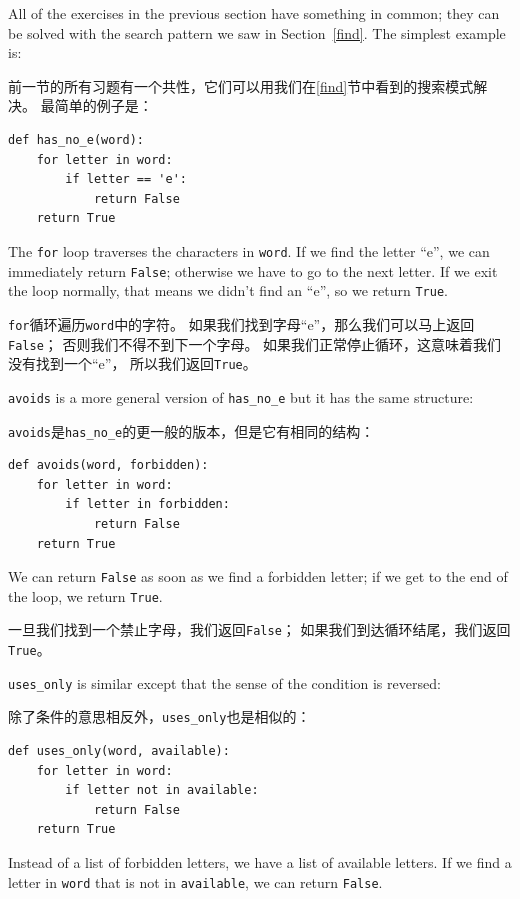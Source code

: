 \documentclass[10pt]{book}
\begin{document}
\begin{CJK}{UTF8}{gbsn}
All of the exercises in the previous section have something
in common; they can be solved with the search pattern we saw
in Section~\ref{find}.  The simplest example is:

前一节的所有习题有一个共性，它们可以用我们在\ref{find}节中看到的搜索模式解决。
最简单的例子是：

\begin{verbatim}
def has_no_e(word):
    for letter in word:
        if letter == 'e':
            return False
    return True
\end{verbatim}
%
The {\tt for} loop traverses the characters in {\tt word}.  If we find
the letter ``e'', we can immediately return {\tt False}; otherwise we
have to go to the next letter.  If we exit the loop normally, that
means we didn't find an ``e'', so we return {\tt True}.

{\tt for}循环遍历{\tt word}中的字符。
如果我们找到字母``e''，那么我们可以马上返回{\tt False}；
否则我们不得不到下一个字母。
如果我们正常停止循环，这意味着我们没有找到一个``e''，
所以我们返回{\tt True}。 



{\tt avoids} is a more general version of \verb"has_no_e" but it
has the same structure:

{\tt avoids}是\verb"has_no_e"的更一般的版本，但是它有相同的结构：

\begin{verbatim}
def avoids(word, forbidden):
    for letter in word:
        if letter in forbidden:
            return False
    return True
\end{verbatim}
%
We can return {\tt False} as soon as we find a forbidden letter;
if we get to the end of the loop, we return {\tt True}.

一旦我们找到一个禁止字母，我们返回{\tt False}；
如果我们到达循环结尾，我们返回{\tt True}。

\verb"uses_only" is similar except that the sense of the condition
is reversed:

除了条件的意思相反外，\verb"uses_only"也是相似的：

\begin{verbatim}
def uses_only(word, available):
    for letter in word: 
        if letter not in available:
            return False
    return True
\end{verbatim}
%
Instead of a list of forbidden letters, we have a list of available
letters.  If we find a letter in {\tt word} that is not in
{\tt available}, we can return {\tt False}.


\end{CJK}
\end{document}
